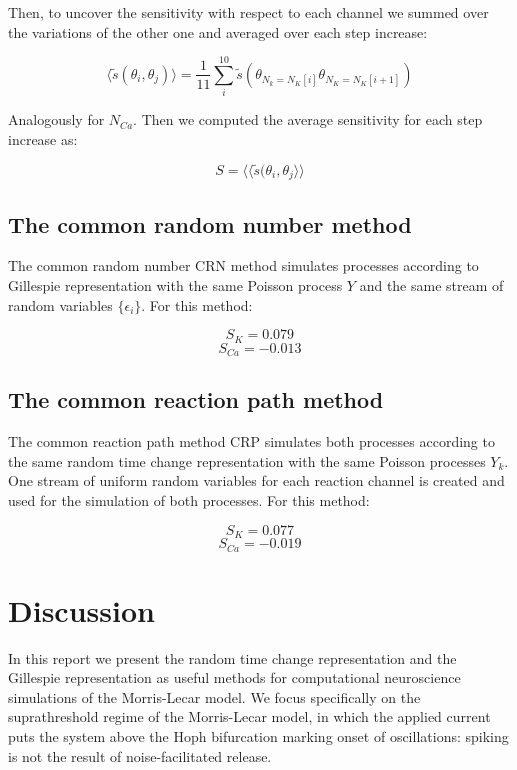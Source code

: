 Then, to uncover the sensitivity with respect to each channel we summed over the variations of the other one and averaged over each step increase:

$$\langle\tilde{s}(\theta_i, \theta_j)\rangle = \frac{1}{11}\sum\limits_{i}^{10}\tilde{s}(\theta_{N_k = N_K[i]}\theta_{N_K= N_K[i+1]})$$

Analogously for $N_{Ca}$.
Then we computed the average sensitivity for each step increase as:

$$S = \langle\langle\tilde{s}(\theta_i,\theta_j\rangle\rangle$$

	\subsection{The common random number method}
	The common random number CRN method simulates processes according to Gillespie representation with the same Poisson process $Y$ and the same stream of random variables $\{\epsilon_i\}$. For this method:

	$$S_{K} = 0.079$$
	$$S_{Ca} = -0.013$$

 	\subsection{The common reaction path method}
	The common reaction path method CRP simulates both processes according to the same random time change representation with the same Poisson processes $Y_k$.
	One stream of uniform random variables for each reaction channel is created and used for the simulation of both processes. For this method:


	$$S_{K} = 0.077$$
	$$S_{Ca} = -0.019$$

\section{Discussion}
\label{section:discussion}

In this report we present the random time change representation and the Gillespie representation as useful methods for computational neuroscience simulations of the Morris-Lecar model. We focus specifically on the suprathreshold regime of the Morris-Lecar model, in which the applied current puts the system above the Hoph bifurcation marking onset of oscillations: spiking is not the result of noise-facilitated release. \\ 

